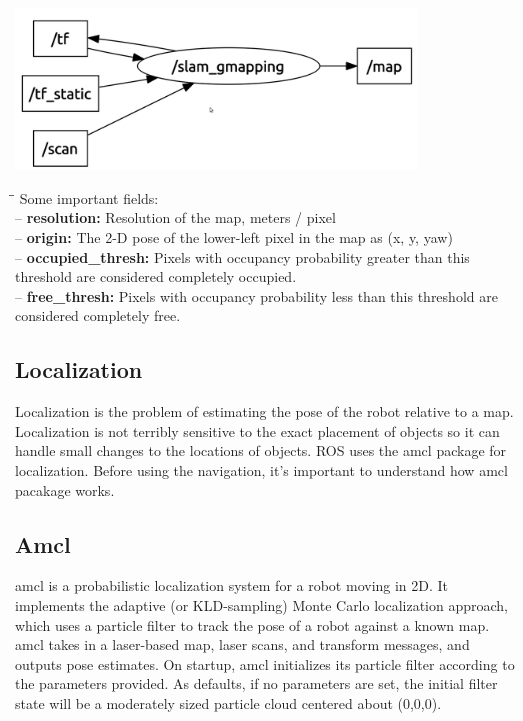 \documentclass[10pt,a4paper]{article}
\begin{document}
\begin{center}
\includegraphics[width=0.8\textwidth]{images/nodes.png}
\end{center}

\begin{tabbing}
\hspace{1cm}\=\hspace{1cm}\=\kill
Some important fields:\\
\>  – \textbf{resolution:} Resolution of the map, meters / pixel \\
\>  – \textbf{origin:} The 2-D pose of the lower-left pixel in the map as (x, y, yaw) \\
\>  – \textbf{occupied\_thresh:} Pixels with occupancy probability greater than this threshold are considered completely occupied. \\
\> – \textbf{free\_thresh:} Pixels with occupancy probability less than this threshold are considered completely free. \\
\end{tabbing}

\subsection{Localization}

Localization is the problem of estimating the pose of the robot relative to a map. Localization is not terribly sensitive to the exact placement of objects so it can handle small changes to the locations of objects. ROS uses the amcl package for localization. Before using the navigation, it’s important to understand how amcl pacakage works. 

\subsection{Amcl}
amcl is a probabilistic localization system for a robot moving in 2D. It implements the adaptive (or KLD-sampling) Monte Carlo localization approach, which uses a particle filter to track the pose of a robot against a known map. amcl takes in a laser-based map, laser scans, and transform messages, and outputs pose estimates. On startup, amcl initializes its particle filter according to the parameters provided. As defaults, if no parameters are set, the initial filter state will be a moderately sized particle cloud centered about (0,0,0).
\end{document}

